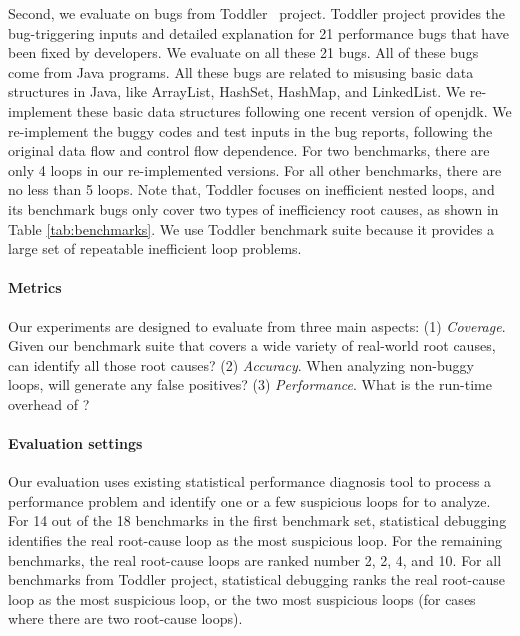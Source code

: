 {\color{red}
Second, we evaluate \Tool on bugs from Toddler~\cite{Alabama, toddlerbuglist} project.
Toddler project provides the bug-triggering inputs and detailed explanation
for 21 performance bugs that have been fixed by developers. We evaluate \Tool on all these 21 bugs.
All of these bugs come from Java programs.
All these bugs are related to misusing basic data structures in Java, like ArrayList, HashSet, HashMap, and LinkedList. 
We re-implement these basic data structures following one recent version of openjdk. 
We re-implement the buggy codes and test inputs in the bug reports, 
following the original data flow and control flow dependence. 
For two benchmarks, there are only 4 loops in our re-implemented versions. 
For all other benchmarks, there are no less than 5 loops.
Note that, Toddler focuses on inefficient nested loops, and its
benchmark bugs only cover two types of inefficiency root causes,
as shown in Table \ref{tab:benchmarks}.
We use Toddler benchmark suite because it provides a large set of
repeatable inefficient loop problems. 
}

\paragraph{Metrics}
Our experiments are designed to evaluate \Tool from three main aspects:
(1) 
\textit{Coverage}. Given our benchmark suite that covers a wide variety
of real-world root causes, can \Tool identify all those root causes?
(2)
\textit{Accuracy}. 
When analyzing non-buggy loops, will \Tool generate any false positives?
(3) 
\textit{Performance}.
What is the run-time overhead of \Tool?

\paragraph{Evaluation settings}
Our evaluation uses existing statistical performance diagnosis
tool \cite{SongOOPSLA2014} to process a performance problem and identify 
one or a few suspicious loops for \Tool to analyze.
For 14 out of the 18 benchmarks {\color{red} in the first benchmark set}, statistical debugging identifies the
real root-cause loop as the most suspicious loop. For the remaining
benchmarks, the real root-cause loops are ranked number 2, 2, 4, and 10.
{\color{red} For all benchmarks from Toddler project, 
statistical debugging ranks the real root-cause loop as the most suspicious loop, 
or the two most suspicious loops (for cases where there are two root-cause loops). }

